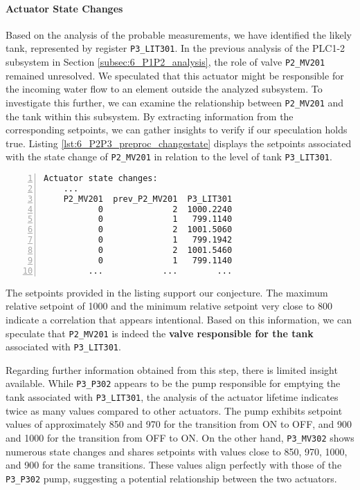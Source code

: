 \paragraph{Actuator State Changes}
\label{par:6_preproc_P2P3_actuator_state_changes}
Based on the analysis of the probable measurements, we have identified the likely tank, represented by register \texttt{P3\_LIT301}. In the previous analysis of the PLC1-2 subsystem in Section \ref{subsec:6_P1P2_analysis}, the role of valve \texttt{P2\_MV201} remained unresolved. We speculated that this actuator might be responsible for the incoming water flow to an element outside the analyzed subsystem. To investigate this further, we can examine the relationship between \texttt{P2\_MV201} and the tank within this subsystem. By extracting information from the corresponding setpoints, we can gather insights to verify if our speculation holds true. \newline 
Listing \ref{lst:6_P2P3_preproc_changestate} displays the setpoints associated with the state change of \texttt{P2\_MV201} in relation to the level of tank \texttt{P3\_LIT301}.

\begin{lstlisting}[language=bash, numbers=left, caption=\texttt{P2\_MV201} state changes in relation to \texttt{P3\_LIT301}, label=lst:6_P2P3_preproc_changestate]
	Actuator state changes:
	...
	P2_MV201  prev_P2_MV201  P3_LIT301
	       0              2  1000.2240
	       0              1   799.1140
	       0              2  1001.5060
	       0              1   799.1942
	       0              2  1001.5460
	       0              1   799.1140
	     ...            ...        ...
\end{lstlisting}

The setpoints provided in the listing support our conjecture. The maximum relative setpoint of 1000 and the minimum relative setpoint very close to 800 indicate a correlation that appears intentional. Based on this information, we can speculate that \texttt{P2\_MV201} is indeed the \textbf{valve responsible for the tank} associated with \texttt{P3\_LIT301}.

\bigskip
Regarding further information obtained from this step, there is limited insight available. While \texttt{P3\_P302} appears to be the pump responsible for emptying the tank associated with \texttt{P3\_LIT301}, the analysis of the actuator lifetime indicates twice as many values compared to other actuators. The pump exhibits setpoint values of approximately 850 and 970 for the transition from ON to OFF, and 900 and 1000 for the transition from OFF to ON. On the other hand, \texttt{P3\_MV302} shows numerous state changes and shares setpoints with values close to 850, 970, 1000, and 900 for the same transitions. These values align perfectly with those of the \texttt{P3\_P302} pump, suggesting a potential relationship between the two actuators.

